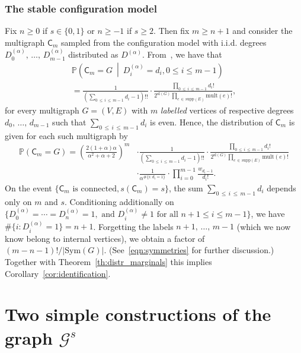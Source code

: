 \documentclass[10pt]{amsart}
\theoremstyle{definition}\newtheorem{defi}[theo]{Definition}\newtheorem{rema}[theo]{Remark}\newtheorem{exam}[theo]{Example}\newtheorem{exem}[theo]{Example}\newtheorem{nota}[theo]{Notation}
\newcommand{\supp}{\mathrm{supp}}
\newcommand{\sll}{\mathrm{sl}}
\newcommand{\Sym}{\mathrm{Sym}}
\newcommand{\mult}{\mathrm{mult}}
\newcommand{\cG}{\mathcal{G}}
\newcommand{\sC}{\mathsf{C}}
\newcommand{\bbP}{\mathbb{P}}
\begin{document}
\subsubsection{The stable configuration model}
Fix $n \geq 0$ if $s\in \{0,1\}$ or $n \geq -1$ if $s \geq 2$. Then fix $m \ge n+1$ and consider the multigraph $\sC_{m}$ sampled from the configuration model with i.i.d. degrees $D^{(\alpha)}_0,\,\ldots,\,D^{(\alpha)}_{m-1}$ distributed as $D^{(\alpha)}$. From~\cite[Proposition~7.7]{RvdH}, we have that
\begin{multline*}
\bbP\left(\sC_{m} = G \ \middle| \ D^{(\alpha)}_i=d_i, 0 \leq i \leq m-1\right)\\
=\frac{1}{\left(\sum\limits_{0\,\leq\,i\,\leq\,m-1} d_i-1\right)!!}\cdot\frac{\prod\limits_{0\,\leq\,i\,\leq\, m-1} d_i!}{2^{\sll(G)}\prod\limits_{e\,\in\,\supp(E)}\mult(e)!},
\end{multline*}
for every multigraph $G=(V,E)$ with $m$ \emph{labelled} vertices of respective degrees $d_0,\,\ldots,\,d_{m-1}$ such that $\sum_{0\,\leq\,i\,\leq\,m-1} d_i$ is even. Hence, the distribution of $\sC_{m}$ is given for each such multigraph by
\begin{align*}
\bbP\left(\sC_{m}=G\right)= \left(\frac{2(1+\alpha)\alpha}{\alpha^2+\alpha+2}\right)^m &\cdot \frac{1}{\left(\sum\limits_{0\,\leq\,i\,\leq\,m-1} d_i-1\right)!!}\cdot\frac{\prod\limits_{0\,\leq\,i\,\leq\,m-1} d_i!}{2^{\sll(G)}\prod\limits_{e\,\in\,\supp(E)}\mult(e)!} \\
&\cdot\frac{1}{\alpha^{\#\{i:d_i=1\}}}\cdot \prod_{i=0}^{m-1}\frac{w_{d_i-1}}{d_i!}.
\end{align*}
On the event $\{\sC_m \text{ is connected}, s(\sC_m) = s\}$, the sum $\sum_{0\,\leq\,i\,\leq\,m-1} d_i$ depends only on $m$ and $s$. Conditioning additionally on $\{D^{(\alpha)}_0 = \cdots = D^{(\alpha)}_{n} = 1, \text{ and } D^{(\alpha)}_i \neq 1 \text{ for all } n+1 \le i \le m-1\}$, we have $\#\{i:D^{(\alpha)}_i=1\} = n+1$. Forgetting the labels $n+1,\,\ldots,\,m-1$ (which we now know belong to internal vertices), we obtain a factor of $(m-n-1)!/|\Sym(G)|$. (See~\eqref{eqn:symmetries} for further discussion.) Together with Theorem~\ref{th:distr_marginals} this implies Corollary~\ref{cor:identification}.


\section{Two simple constructions of the graph \texorpdfstring{$\cG^s$}{Gs}}\label{sec:final}
\end{document}

